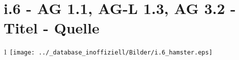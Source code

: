 \section{i.6 - AG 1.1, AG-L 1.3, AG 3.2 - Titel - Quelle}

\begin{langesbeispiel}\item[1] %
\texttt{[image: ../\_database\_inoffiziell/Bilder/i.6\_hamster.eps]}

\end{langesbeispiel}